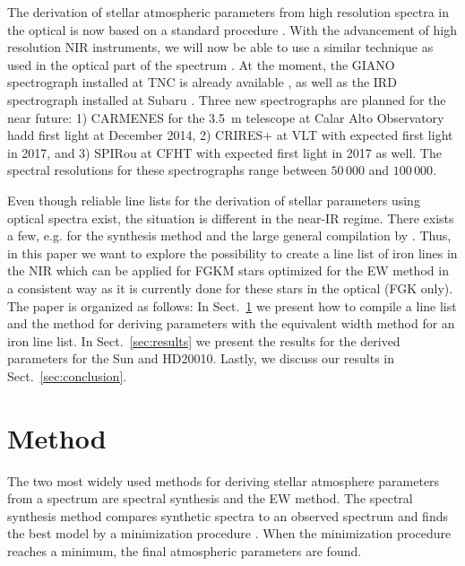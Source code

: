 \documentclass{aa}
\begin{document}
The derivation of stellar atmospheric parameters from high
resolution spectra in the optical is now based on a standard
procedure \citep[see e.g.][]{Valenti2005,Sousa2008a}. With the
advancement of high resolution NIR instruments, we will now be able to use a similar
technique as used in the optical part of the spectrum
\citep[see e.g.][]{Melendez1999,Sousa2008a,Tsantaki2013,Mucciarelli2013,Bensby2014}.
At the moment, the GIANO spectrograph installed at TNC is already
available \citep{GIANO}, as well as the IRD spectrograph installed
at Subaru \citep{IRD}. Three new spectrographs are planned for the
near future: 1) CARMENES for the \SI{3.5}{m} telescope at Calar Alto
Observatory \citep{CARMENES} hadd first light at December 2014,
2) CRIRES+ at VLT \citep{CRIRESp} with expected first light in 2017,
and 3) SPIRou at CFHT \citep{SPIROU1,SPIROU2} with expected first light
in 2017 as well. The spectral resolutions for these spectrographs range
between $50\,000$ and $100\,000$.

Even though reliable line lists for the derivation of stellar parameters
using optical spectra exist, the situation is different in the near-IR
regime. There exists a few, e.g. \citet{Onehag2012,Rhodin2015}
for the synthesis method and the large general compilation by
\citet{Melendez1999}. Thus, in this paper we want to explore the
possibility to create a line list of iron lines in the NIR which can
be applied for FGKM stars optimized for the EW method in a consistent way as it is currently done
for these stars in the optical (FGK only). The paper is organized as follows: In
Sect.~\ref{sec:method} we present how to compile a line list and the
method for deriving parameters with the equivalent width method for an
iron line list. In Sect.~\ref{sec:results} we present the results for
the derived parameters for the Sun and HD20010. Lastly, we discuss our
results in Sect.~\ref{sec:conclusion}.


\section{Method}
\label{sec:method}

The two most widely used methods for deriving stellar atmosphere
parameters from a spectrum are spectral synthesis and the EW method.
The spectral synthesis method compares synthetic spectra to an observed
spectrum and finds the best model by a minimization procedure \citep[see
e.g.][]{Valenti2005,Onehag2012,Blanco2014}. When the minimization
procedure reaches a minimum, the final atmospheric parameters are found.
\end{document}
